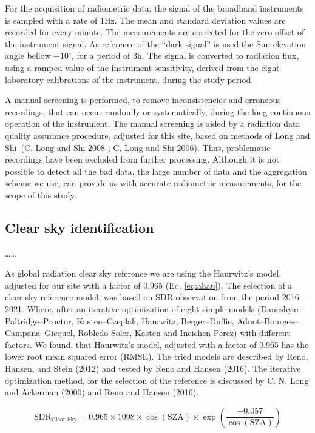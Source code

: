 \documentclass[
  preprint, 3p, authoryear]{article}
\begin{document}
For the acquisition of radiometric data,
the signal of the broadband instruments is sampled with a rate of \(1 \text{Hz}\). The mean and standard deviation values are recorded for every minute.
The measurements are corrected for the zero offset of the instrument signal.
As reference of the ``dark signal'' is used the Sun elevation angle bellow \(-10^\circ\), for a period of \(3 \text{h}\).
The signal is converted to radiation flux, using a ramped value of the instrument sensitivity, derived from the eight laboratory calibrations of the instrument, during the study period.

A manual screening is performed, to remove inconsistencies and erroneous recordings, that can occur randomly or systematically, during the long continuous operation of the instrument.
The manual screening is aided by a radiation data quality assurance procedure, adjusted for this site, based on methods of Long and Shi~(C. Long and Shi 2008 ; C. Long and Shi 2006).
Thus, problematic recordings have been excluded from further processing.
Although it is not possible to detect all the bad data, the large number of data and the aggregation scheme we use, can provide us with accurate radiometric measurements, for the scope of this study.

\hypertarget{clear-sky-identification}{%
\subsection{Clear sky identification}\label{clear-sky-identification}}

\ldots\ldots{}

As global radiation clear sky reference we are using the Haurwitz's model, adjusted for our site with a factor of 0.965 (Eq. \ref{eq:ahau}).
The selection of a clear sky reference model, was based on SDR observation from the period 2016 -- 2021.
Where, after an iterative optimization of eight simple models (Daneshyar--Paltridge--Proctor, Kasten--Czeplak, Haurwitz, Berger--Duffie, Adnot--Bourges--Campana--Gicquel, Robledo-Soler, Kasten and Ineichen-Perez) with different factors.
We found, that Haurwitz's model, adjusted with a factor of 0.965 has the lower root mean squared error (RMSE).
The tried models are described by Reno, Hansen, and Stein (2012) and tested by Reno and Hansen (2016).
The iterative optimization method, for the selection of the reference is discussed by C. N. Long and Ackerman (2000) and Reno and Hansen (2016).

\begin{equation}
\text{SDR}_\text{Clear Sky} = 0.965 \times 1098 \times \cos( \text{SZA} ) \times \exp \left( \frac{ - 0.057}{\cos(\text{SZA})} \right) \label{eq:ahau}
\end{equation}
\end{document}
